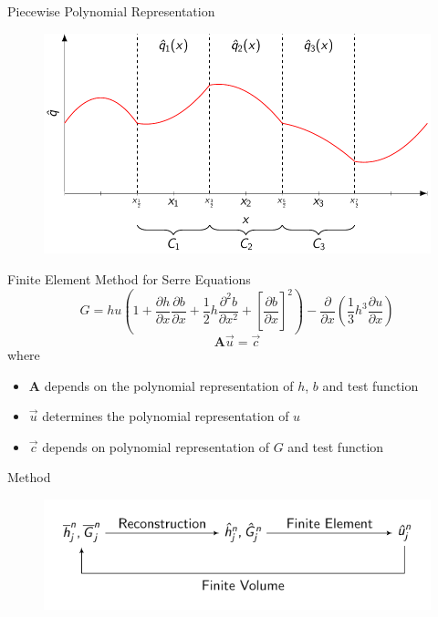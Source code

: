 \documentclass[]{beamer}
\begin{document}
\begin{frame}{Piecewise Polynomial Representation}
	\begin{figure}
		\includegraphics[width=\textwidth]{./Pics/PolyRep/P2.pdf}
	\end{figure}
\end{frame}


\begin{frame}{Finite Element Method for Serre Equations}
		\[ G =  h {u} \left(1 + \frac{\partial h}{\partial x}\frac{\partial b}{\partial x} + \frac{1}{2}h\frac{\partial^2 b}{\partial x^2} + \left[\frac{\partial b}{\partial x}\right]^2 \right) - \frac{\partial}{\partial x}\left(\frac{1}{3}h^3  \frac{\partial {u}}{\partial x}\right)\]
	\pause
	\begin{equation*}
	\boldsymbol{A} \vec{u} = \vec{c}
	\end{equation*}
	where 
	\begin{itemize}
		\item $\boldsymbol{A}$ depends on the polynomial representation of $h$, $b$ and test function
		\item $\vec{u}$ determines the polynomial representation of $u$
		\item $\vec{c}$ depends on polynomial representation of $G$ and test function
	\end{itemize}
\end{frame}


\begin{frame}{Method}
		\begin{figure}
			\includegraphics[width=\textwidth]{./Pics/ModelDiagrams/FlowChartNoBox.pdf}
		\end{figure}
\end{frame}
\end{document}
